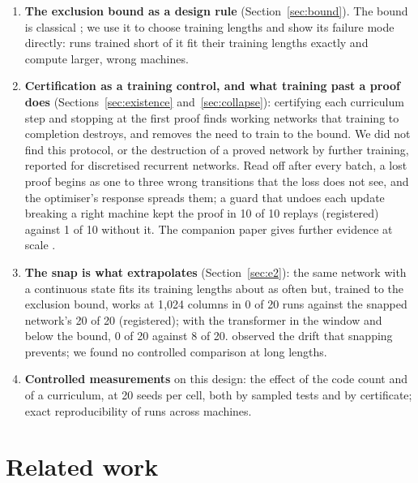 \documentclass[11pt]{article}
\begin{document}
\begin{enumerate}
  finding, made by an automaton-learning search; we show it with a complete enumeration, including
  a network that passed all 328{,}000 long-test cases to 1{,}024 columns and is wrong at 12.
\item \textbf{The exclusion bound as a design rule} (Section~\ref{sec:bound}). The bound is
  classical \citep{moore-1956-gedanken-experiments-sequential-machines,hopcroft-ullman-1979}; we use it to choose training lengths
  and show its failure mode directly: runs trained short of it fit their training lengths exactly
  and compute larger, wrong machines.
\item \textbf{Certification as a training control, and what training past a proof does}
  (Sections~\ref{sec:existence} and~\ref{sec:collapse}): certifying each
  curriculum step and stopping at the first proof finds working networks that training to
  completion destroys, and removes the need to train to the bound. We did not find this protocol,
  or the destruction of a proved network by further training, reported for discretised recurrent
  networks. Read off after every batch, a lost proof begins as one to
  three wrong transitions that the loss does not see, and the optimiser's response spreads them;
  a guard that undoes each update breaking a right machine kept the proof in 10 of 10 replays
  (registered) against 1 of 10 without it. The companion paper gives further evidence at scale
  \citep{barkhuizen-2026-certified-modular-division}.
\item \textbf{The snap is what extrapolates} (Section~\ref{sec:e2}): the same network with a
  continuous state fits its training lengths about as often but, trained to the exclusion bound,
  works at 1{,}024 columns in 0 of 20 runs against the snapped network's 20 of 20 (registered); with
  the transformer in the window and below the bound, 0 of 20 against 8 of 20. \citet{zeng-1993-self-clustering-recurrent-networks}
  observed the drift that snapping prevents; we found no controlled comparison at long lengths.
\item \textbf{Controlled measurements} on this design: the effect of the code count and of a
  curriculum, at 20 seeds per cell, both by sampled tests and by certificate; exact
  reproducibility of runs across machines.
\end{enumerate}

\section{Related work}
\label{sec:related}
\end{document}
